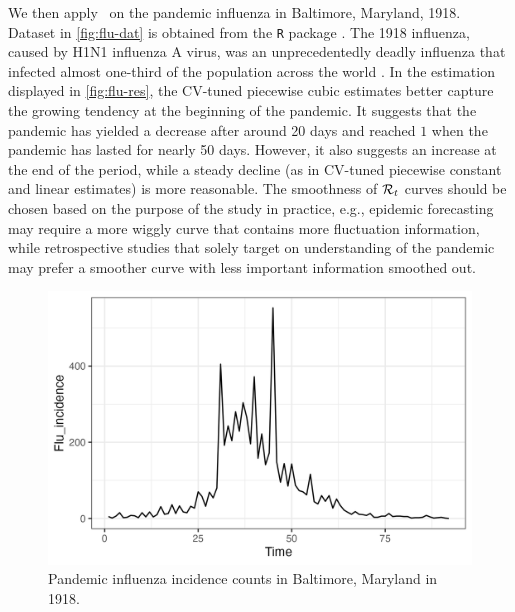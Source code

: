 We then apply \RtEstim\ on the pandemic influenza in Baltimore, Maryland, 1918. Dataset in \autoref{fig:flu-dat} is obtained from the \texttt{R} package \EpiEstim. The 1918 influenza, caused by H1N1 influenza A virus, was an unprecedentedly deadly influenza that infected almost one-third of the population across the world \citep{taubenberger20061918}. 
In the estimation displayed in \autoref{fig:flu-res}, the CV-tuned piecewise
cubic estimates better capture the growing tendency at the beginning of the
pandemic. It suggests that the pandemic has yielded a decrease after around 20
days and reached $1$ when the pandemic has lasted for nearly 50 days. However,
it also suggests an increase at the end of the period, while a steady decline
(as in CV-tuned piecewise constant and linear estimates) is more reasonable. The
smoothness of $\mathcal{R}_t$ curves should be chosen based on the purpose of the
study in practice, e.g., epidemic forecasting may require a more wiggly curve
that contains more fluctuation information, while retrospective studies that
solely target on understanding of the pandemic may prefer a smoother curve with
less important information smoothed out. 

\begin{figure}[tb]
    \centering
    \includegraphics[width=0.9\linewidth]{fig/flu_dat.png}
    \caption{Pandemic influenza incidence counts in Baltimore, Maryland in 1918.} 
    \label{fig:flu-dat}
\end{figure} 

